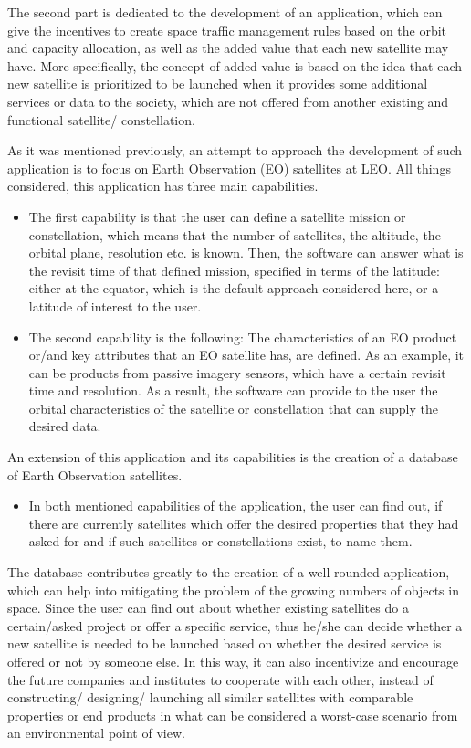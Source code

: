 The second part is dedicated to the development of an application, which can give the incentives to create space traffic management rules based on the orbit and capacity allocation, as well as the added value that each new satellite may have. More specifically, the concept of added value is based on the idea that each new satellite is prioritized to be launched when it provides some additional services or data to the society, which are not offered from another existing and functional satellite/ constellation.

As it was mentioned previously, an attempt to approach the development of such application is to focus on Earth Observation (EO) satellites at LEO. All things considered, this application has three main capabilities.

\begin{itemize}
\item The first capability is that the user can define a satellite mission or constellation, which means that the number of satellites, the altitude, the orbital plane, resolution etc. is known. Then, the software can answer what is the revisit time of that defined mission, specified in terms of the latitude: either at the equator, which is the default approach considered here, or a latitude of interest to the user.
\item The second capability is the following: The characteristics of an EO product or/and key attributes that an EO satellite has, are defined. As an example, it can be products from passive imagery sensors, which have a certain revisit time and resolution. As a result, the software can provide to the user the orbital characteristics of the satellite or constellation that can supply the desired data.
\end{itemize}

An extension of this application and its capabilities is the creation of a database of Earth Observation satellites.

\begin{itemize}
\item In both mentioned capabilities of the application, the user can find out, if there are currently satellites which offer the desired properties that they had asked for and if such satellites or constellations exist, to name them.
\end{itemize}

The database contributes greatly to the creation of a well-rounded application, which can help into mitigating the problem of the growing numbers of objects in space. Since the user can find out about whether existing satellites do a certain/asked project or offer a specific service, thus he/she can decide whether a new satellite is needed to be launched based on whether the desired service is offered or not by someone else. In this way, it can also incentivize and encourage the future companies and institutes to cooperate with each other, instead of constructing/ designing/ launching all similar satellites with comparable properties or end products in what can be considered a worst-case scenario from an environmental point of view.

